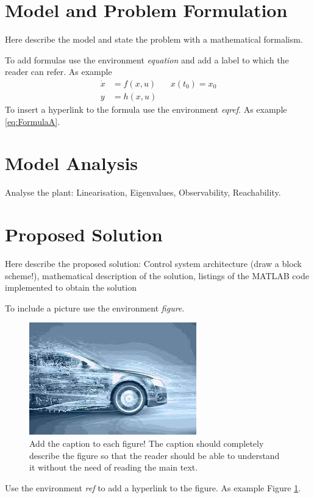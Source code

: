 \documentclass[]{report}
\begin{document}
\section{Model and Problem Formulation}
Here describe the  model and state the problem with a mathematical formalism.

To add formulas use the environment \textit{equation} and add a label to which the reader can refer. As example
\begin{equation}
	\label{eq:FormulaA}
	\begin{aligned}
		\dot{x} &= f(x,u) && x(t_0) = x_0
\\
y &= h(x,u)
\end{aligned}
\end{equation}
To insert a hyperlink to the formula use the environment \textit{eqref}. As example \eqref{eq:FormulaA}.

\section{Model Analysis}
Analyse the plant: Linearisation, Eigenvalues, Observability, Reachability.

\section{Proposed Solution}
Here describe the proposed solution: Control system architecture (draw a block scheme!), mathematical description of the solution, listings of the MATLAB code implemented to obtain the solution

To include a picture use the environment \textit{figure}. 
\begin{figure}[h!]
	\centering
	\includegraphics[width=0.7\columnwidth]{Figure}
	\caption{Add the caption to each figure! The caption should completely describe the figure so that the reader should be able to understand it without the need of reading the main text.}
	\label{fig:FigureA}
\end{figure}
Use the environment \textit{ref} to add a hyperlink to the figure. As example Figure \ref{fig:FigureA}.
\end{document}
